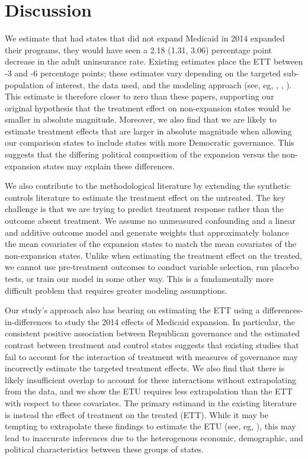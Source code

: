 \documentclass[12pt]{article}
\begin{document}
\section{Discussion}

We estimate that had states that did not expand Medicaid in 2014 expanded their programs, they would have seen a 2.18 (1.31, 3.06) percentage point decrease in the adult uninsurance rate. Existing estimates place the ETT between -3 and -6 percentage points; these estimates vary depending on the targeted sub-population of interest, the data used, and the modeling approach (see, eg, \cite{courtemanche2017early}, \cite{kaestner2017effects}, \cite{frean2017premium}). This estimate is therefore closer to zero than these  papers, supporting our original hypothesis that the treatment effect on non-expansion states would be smaller in absolute magnitude. Moreover, we also find that we are likely to estimate treatment effects that are larger in absolute magnitude when allowing our comparison states to include states with more Democratic governance. This suggests that the differing political composition of the expansion versus the non-expansion states may explain these differences.

We also contribute to the methodological literature by extending the synthetic controls literature to estimate the treatment effect on the untreated. The key challenge is that we are trying to predict treatment response rather than the outcome absent treatment. We assume no unmeasured confounding and a linear and additive outcome model and generate weights that approximately balance the mean covariates of the expansion states to match the mean covariates of the non-expansion states. Unlike when estimating the treatment effect on the treated, we cannot use pre-treatment outcomes to conduct variable selection, run placebo tests, or train our model in some other way. This is a fundamentally more difficult problem that requires greater modeling assumptions.

Our study's approach also has bearing on estimating the ETT using a differences-in-differences to study the 2014 effects of Medicaid expansion. In particular, the consistent positive association between Republican governance and the estimated contrast between treatment and control states suggests that existing studies that fail to account for the interaction of treatment with measures of governance may incorrectly estimate the targeted treatment effects. We also find that there is likely insufficient overlap to account for these interactions without extrapolating from the data, and we show the ETU requires less extrapolation than the ETT with respect to these covariates. The primary estimand in the existing literature is instead the effect of treatment on the treated (ETT). While it may be tempting to extrapolate these findings to estimate the ETU (see, eg, \cite{miller2019medicaid}), this may lead to inaccurate inferences due to the heterogenous economic, demographic, and political characteristics between these groups of states.
\end{document}
